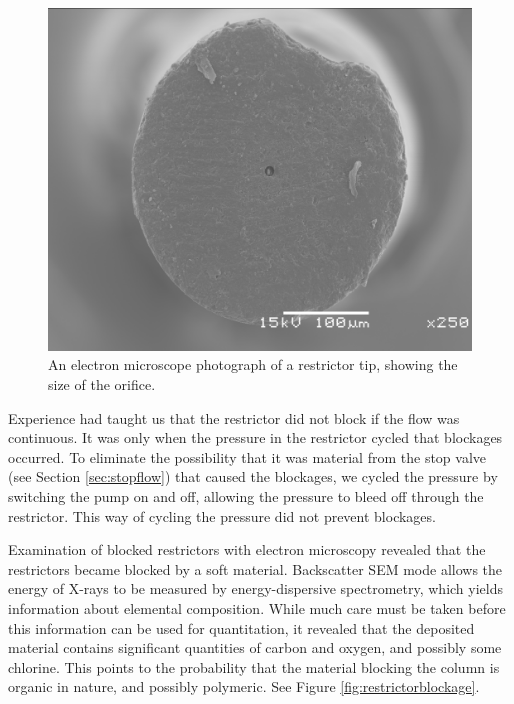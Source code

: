\begin{figure}
\centering
\includegraphics[width=\textwidth]{Figures/sem_h_001.png}
\decoRule

\caption[A electron microscope photo of a restrictor orifice]{An electron
microscope photograph of a restrictor tip, showing the size of the orifice.}

\label{fig:restrictororifice}
\end{figure}

Experience had taught us that the restrictor did not block if the flow was
continuous. It was only when the pressure in the restrictor cycled that
blockages occurred. To eliminate the possibility that it was material from the
stop valve (see Section \ref{sec:stopflow}) that caused the blockages, we cycled
the pressure by switching the pump on and off, allowing the pressure to bleed
off through the restrictor. This way of cycling the pressure did not prevent
blockages.

Examination of blocked restrictors with electron microscopy revealed that the
restrictors became blocked by a soft material. Backscatter SEM mode allows the
energy of X-rays to be measured by energy-dispersive spectrometry, which yields
information about elemental composition. While much care must be taken before
this information can be used for quantitation, it revealed that the deposited
material contains significant quantities of carbon and oxygen, and possibly some
chlorine. This points to the probability that the material blocking the column
is organic in nature, and possibly polymeric. See Figure
\ref{fig:restrictorblockage}.

